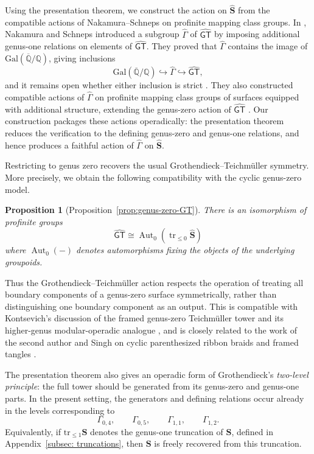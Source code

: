 \documentclass{amsart}
\newcommand{\bS}{\mathbf{S}}
\newcommand{\galQ}{\mathbf{\mathrm{Gal}}(\overline{\mathbb{Q}}/\mathbb{Q})}
\newcommand{\trun}[1]{\mathrm{tr}_{\leq{#1}}}
\newcommand{\GT}{\widehat{\mathsf{GT}}}
\newcommand{\NS}{\widehat{\mathsf{\Gamma}}}
\newtheorem*{prop*}{Proposition}%
\theoremstyle{definition}
\numberwithin{equation}{section}
\begin{document}
Using the presentation theorem, we construct the action on $\widehat{\bS}$ from the compatible actions of Nakamura--Schneps on profinite mapping class groups. In \cite{Nakamura-Schneps}, Nakamura and Schneps introduced a subgroup $\NS$ of $\GT$ by imposing additional genus-one relations on elements of $\GT$. They proved that $\NS$ contains the image of $\galQ$, giving inclusions
    \[\galQ\hookrightarrow \NS\hookrightarrow \GT,\]
and it remains open whether either inclusion is strict \cite[Theorem~1.2]{Nakamura-Schneps}. They also constructed compatible actions of $\NS$ on profinite mapping class groups of surfaces equipped with additional structure, extending the genus-zero action of $\GT$ \cite[Theorem~1.4]{Nakamura-Schneps}. Our construction packages these actions operadically: the presentation theorem reduces the verification to the defining genus-zero and genus-one relations, and hence produces a faithful action of $\NS$ on $\widehat{\bS}$.


Restricting to genus zero recovers the usual Grothendieck--Teichm\"uller symmetry. More precisely, we obtain the following compatibility with the cyclic genus-zero model.

\begin{prop*}[Proposition~\ref{prop:genus-zero-GT}]
There is an isomorphism of profinite groups
    \[\GT\cong \operatorname{Aut}_0(\operatorname{tr}_{\leq 0}\widehat{\mathbf S})\]
where $\operatorname{Aut}_0(-)$ denotes automorphisms fixing the objects of the underlying groupoids.
\end{prop*}

Thus the Grothendieck--Teichm\"uller action respects the operation of treating all boundary components of a genus-zero surface symmetrically, rather than distinguishing one boundary component as an output. This is compatible with Kontsevich's discussion of the framed genus-zero Teichm\"uller tower and its higher-genus modular-operadic analogue \cite{KontBourbaki}, and is closely related to the work of the second author and Singh on cyclic parenthesized ribbon braids and framed tangles \cite{robertson2025grothendieck}.


The presentation theorem also gives an operadic form of Grothendieck's \emph{two-level principle}: the full tower should be generated from its genus-zero and genus-one parts. In the present setting, the generators and defining relations occur already in the levels corresponding to
    \[\Gamma_{0,4},\qquad \Gamma_{0,5},\qquad \Gamma_{1,1},\qquad \Gamma_{1,2}.\]
Equivalently, if $\trun{1}\bS$ denotes the genus-one truncation of $\bS$, defined in Appendix~\ref{subsec: truncations}, then $\bS$ is freely recovered from this truncation.
\end{document}
